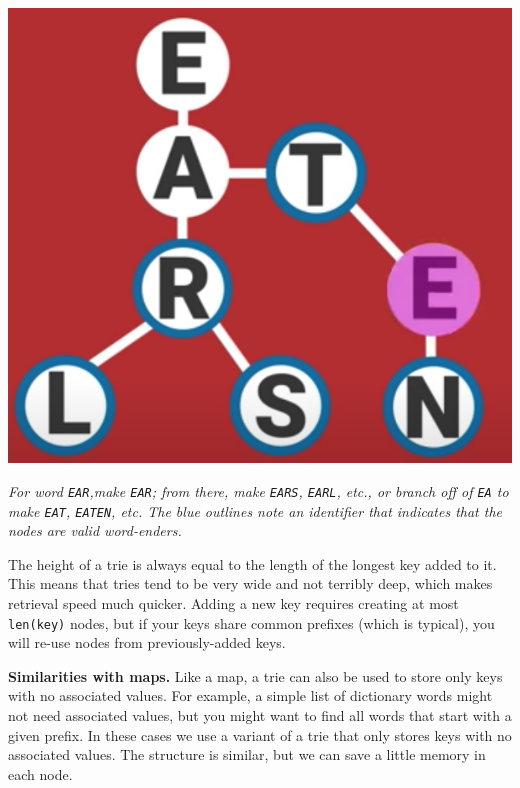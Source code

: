 \documentclass[12pt]{article}
\begin{document}
	\begin{center}
		\includegraphics[scale=0.5]{img/trie.png}\vspace{1.5mm}
		
		\parbox{4in}{\centering\textit{For word \texttt{EAR},make \texttt{E}\textrightarrow \texttt{A}\textrightarrow \texttt{R}; from there, make \texttt{EARS}, \texttt{EARL}, etc., or branch off of \texttt{EA} to make \texttt{EAT}, \texttt{EATEN}, etc. The blue outlines note an identifier that indicates that the nodes are valid word-enders.}}
	\end{center}
		
	The height of a trie is always equal to the length of the longest key added to it. This means that tries tend to be very wide and not terribly deep, which makes retrieval speed much quicker. Adding a new key requires creating at most \texttt{len(key)} nodes, but if your keys share common prefixes (which is typical), you will re-use nodes from previously-added keys.
		
	\textbf{Similarities with maps.} Like a map, a trie can also be used to store only keys with no associated values. For example, a simple list of dictionary words might not need associated values, but you might want to find all words that start with a given prefix. In these cases we use a variant of a trie that only stores keys with no associated values. The structure is similar, but we can save a little memory in each node.
	
\end{document}
